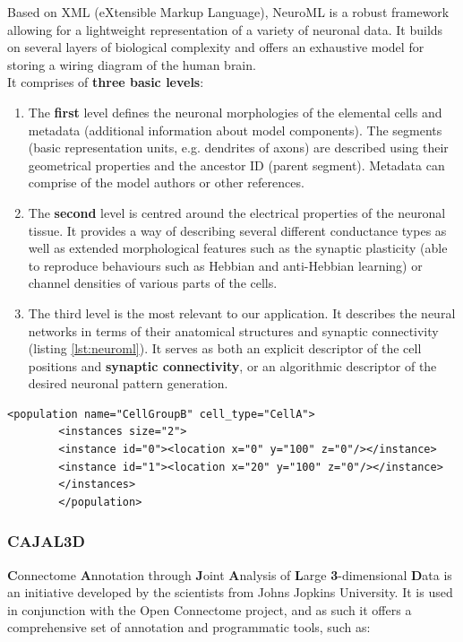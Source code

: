 \documentclass[a4paper, 11pt]{article}
\numberwithin{equation}{section}
\begin{document}
		Based on XML (eXtensible Markup Language), NeuroML is a robust framework allowing for a lightweight representation of a variety of neuronal data. It builds on several layers of biological complexity and offers an exhaustive model for storing a wiring diagram of the human brain. \\
		It comprises of \textbf{three basic levels}:
		\begin{enumerate}
			\item The \textbf{first} level defines the neuronal morphologies of the elemental cells and metadata (additional information about model components). The segments (basic representation units, e.g. dendrites of axons) are described using their geometrical properties and the ancestor ID (parent segment). Metadata can comprise of the model authors or other references.
			\item The \textbf{second} level is centred around the electrical properties of the neuronal tissue. It provides a way of describing several different conductance types as well as extended morphological features such as the synaptic plasticity (able to reproduce behaviours such as Hebbian and anti-Hebbian learning) or channel densities of various parts of the cells.
			\item The third level is the most relevant to our application. It describes the neural networks in terms of their anatomical structures and synaptic connectivity (listing \ref{lst:neuroml}). It serves as both an explicit descriptor of the cell positions and \textbf{synaptic connectivity}, or an algorithmic descriptor of the desired neuronal pattern generation.
		\end{enumerate}
		
		
		\begin{lstlisting}[caption={A population object in NeuroML},label={lst:neuroml}]
		<population name="CellGroupB" cell_type="CellA">
		<instances size="2">
		<instance id="0"><location x="0" y="100" z="0"/></instance>
		<instance id="1"><location x="20" y="100" z="0"/></instance>
		</instances>
		</population>
		\end{lstlisting}
		
		\subsubsection{CAJAL3D}
		\label{Cajal}
		\textbf{C}onnectome \textbf{A}nnotation through \textbf{J}oint \textbf{A}nalysis of \textbf{L}arge \textbf{3}-dimensional \textbf{D}ata is an initiative developed by the scientists from Johns Jopkins University. It is used in conjunction with the Open Connectome project, and as such it offers a comprehensive set of annotation and programmatic tools, such as:
		
\end{document}
